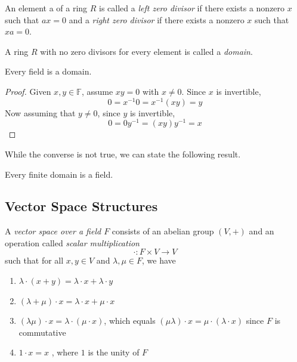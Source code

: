 \documentclass{article}
\begin{document}
\begin{definition}
  An element a of a ring $R$ is called a \textit{left zero divisor} if there exists a nonzero $x$ such that $a x = 0$ and a \textit{right zero divisor} if there exists a nonzero $x$ such that $x a = 0$. 
\end{definition}

\begin{definition}
  A ring $R$ with no zero divisors for every element is called a \textit{domain}. 
\end{definition}

\begin{proposition}
  Every field is a domain. 
\end{proposition}
\begin{proof}
  Given $x, y \in \mathbb{F}$, assume $x y = 0$ with $x \neq 0$. Since $x$ is invertible,
  \begin{equation}
    0 = x^{-1} 0 = x^{-1} (x y) = y
  \end{equation}
  Now assuming that $y \neq 0$, since $y$ is invertible, 
  \begin{equation}
    0 = 0 y^{-1} = (x y) y^{-1} = x
  \end{equation}
\end{proof}

While the converse is not true, we can state the following result. 

\begin{theorem}
  Every finite domain is a field. 
\end{theorem}

\subsection{Vector Space Structures}

\begin{definition}
   A \textit{vector space over a field $F$} consists of an abelian group $(V, +)$ and an operation called \textit{scalar multiplication} 
   \begin{equation}
     \cdot: F \times V \rightarrow V
   \end{equation}
  such that for all $x, y\in V$ and $\lambda, \mu \in F$, we have 
  \begin{enumerate}
    \item $\lambda \cdot (x + y) = \lambda \cdot x + \lambda \cdot y$
    \item $(\lambda + \mu) \cdot x = \lambda \cdot x + \mu \cdot x$ 
    \item $(\lambda \mu) \cdot x = \lambda \cdot (\mu \cdot x )$, which equals $(\mu \lambda) \cdot x = \mu \cdot (\lambda \cdot x)$ since $F$ is commutative 
    \item $1 \cdot x = x$ , where $1$ is the unity of $F$
  \end{enumerate}
\end{definition}
\end{document}
